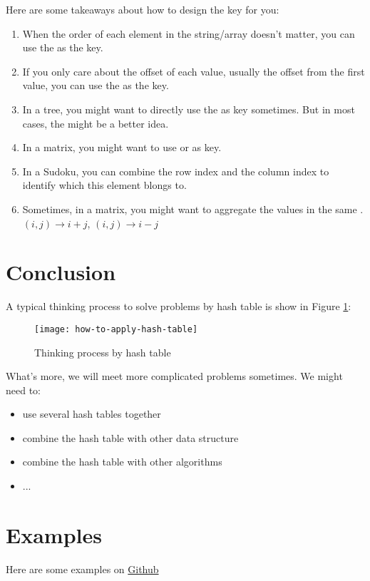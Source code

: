 Here are some takeaways about how to design the key for you:
\begin{enumerate}
\item When the order of each element in the string/array doesn't matter, you can use the  as the key.
\item If you only care about the offset of each value, usually the offset from the first value, you can use the  as the key.
\item In a tree, you might want to directly use the  as key sometimes. But in most cases, the  might be a better idea.
\item In a matrix, you might want to use  or  as key.
\item In a Sudoku, you can combine the row index and the column index to identify which  this element blongs to.
\item Sometimes, in a matrix, you might want to aggregate the values in the same . $(i,j) \rightarrow i+j$, $(i,j) \rightarrow i-j$
\end{enumerate}



\section{Conclusion}

A typical thinking process to solve problems by hash table is show in Figure \ref{fig:how-to-apply-hash-table}:
\begin{figure}[!ht]
  \centering
  \texttt{[image: how-to-apply-hash-table]}
  \caption{Thinking process by hash table}
  \label{fig:how-to-apply-hash-table}
\end{figure}



What's more, we will meet more complicated problems sometimes. We might need to:

\begin{itemize}
\item use several hash tables together
\item combine the hash table with other data structure
\item combine the hash table with other algorithms
\item ...
\end{itemize}


\section{Examples}
\label{sec:examples-6}

Here are some examples on \href{https://github.com/mingmingli916/algorithms/tree/main/hash_table}{Github}